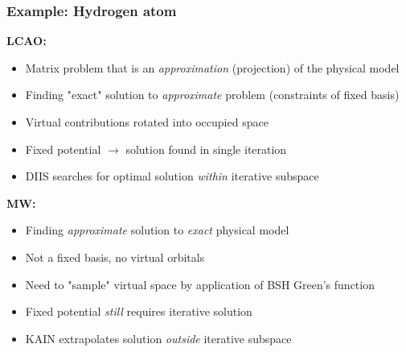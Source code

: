 \begin{frame}
  \frametitle{Example: Hydrogen atom}

  \textbf{LCAO:}
  \begin{itemize}
    \item Matrix problem that is an \emph{approximation} (projection) of the physical model
    \item Finding "exact" solution to \emph{approximate} problem (constraints of fixed basis)
    \item Virtual contributions rotated into occupied space
    \item Fixed potential $\rightarrow$ solution found in single iteration
    \item DIIS searches for optimal solution \emph{within} iterative subspace
  \end{itemize}

  \vspace{5mm}

  \textbf{MW:}
  \begin{itemize}
    \item Finding \emph{approximate} solution to \emph{exact} physical model
    \item Not a fixed basis, no virtual orbitals
    \item Need to "sample" virtual space by application of BSH Green's function
    \item Fixed potential \emph{still} requires iterative solution
    \item KAIN extrapolates solution \emph{outside} iterative subspace
  \end{itemize}
\end{frame}

